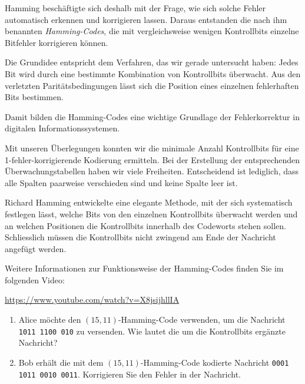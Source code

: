 Hamming beschäftigte sich deshalb mit der Frage, wie sich
solche Fehler automatisch erkennen und korrigieren lassen.
Daraus entstanden die nach ihm benannten \emph{Hamming-Codes},
die mit vergleichsweise wenigen Kontrollbits einzelne
Bitfehler korrigieren können.

Die Grundidee entspricht dem Verfahren, das wir gerade
untersucht haben: Jedes Bit wird durch eine bestimmte
Kombination von Kontrollbits überwacht. Aus den verletzten
Paritätsbedingungen lässt sich die Position eines einzelnen
fehlerhaften Bits bestimmen.

Damit bilden die Hamming-Codes eine wichtige Grundlage
der Fehlerkorrektur in digitalen Informationssystemen.

\begin{myexercise}
    Mit unseren Überlegungen konnten wir die minimale Anzahl
    Kontrollbits für eine 1-fehler-korrigierende Kodierung ermitteln.
    Bei der Erstellung der entsprechenden Überwachungstabellen
    haben wir viele Freiheiten. Entscheidend ist lediglich, dass
    alle Spalten paarweise verschieden sind und keine Spalte leer ist.

    Richard Hamming entwickelte eine elegante Methode, mit der
    sich systematisch festlegen lässt, welche Bits von den einzelnen
    Kontrollbits überwacht werden und an welchen Positionen die
    Kontrollbits innerhalb des Codeworts stehen sollen. Schliesslich
    müssen die Kontrollbits nicht zwingend am Ende der Nachricht
    angefügt werden.

    Weitere Informationen zur Funktionsweise der Hamming-Codes
    finden Sie im folgenden Video:

    \begin{center}
        \url{https://www.youtube.com/watch?v=X8jsijhllIA}
    \end{center}



    \begin{enumerate}
        \item Alice möchte den \((15,11)\)-Hamming-Code verwenden,
              um die Nachricht \texttt{1011 1100 010} zu versenden.
              Wie lautet die um die Kontrollbits ergänzte Nachricht?

        \item Bob erhält die mit dem \((15,11)\)-Hamming-Code
              kodierte Nachricht \texttt{0001 1011 0010 0011}.
              Korrigieren Sie den Fehler in der Nachricht.
    \end{enumerate}


\end{myexercise}
